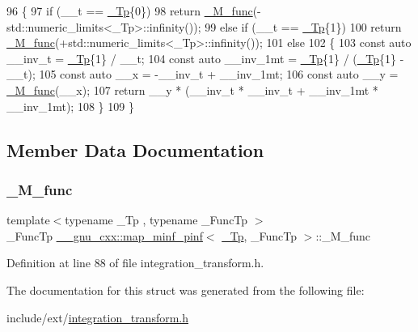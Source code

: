 \begin{DoxyCode}
96       \{
97         \textcolor{keywordflow}{if} (\_\_t == \hyperlink{namespace____gnu__cxx_a3b19a9c800ca194374ef9172290f7d79}{\_Tp}\{0\})
98           \textcolor{keywordflow}{return} \hyperlink{struct____gnu__cxx_1_1map__minf__pinf_a38f287d24e3b40dc964637ac5e8f2532}{\_M\_func}(-std::numeric\_limits<\_Tp>::infinity());
99         \textcolor{keywordflow}{else} \textcolor{keywordflow}{if} (\_\_t == \hyperlink{namespace____gnu__cxx_a3b19a9c800ca194374ef9172290f7d79}{\_Tp}\{1\})
100           \textcolor{keywordflow}{return} \hyperlink{struct____gnu__cxx_1_1map__minf__pinf_a38f287d24e3b40dc964637ac5e8f2532}{\_M\_func}(+std::numeric\_limits<\_Tp>::infinity());
101         \textcolor{keywordflow}{else}
102           \{
103             \textcolor{keyword}{const} \textcolor{keyword}{auto} \_\_inv\_t = \hyperlink{namespace____gnu__cxx_a3b19a9c800ca194374ef9172290f7d79}{\_Tp}\{1\} / \_\_t;
104             \textcolor{keyword}{const} \textcolor{keyword}{auto} \_\_inv\_1mt = \hyperlink{namespace____gnu__cxx_a3b19a9c800ca194374ef9172290f7d79}{\_Tp}\{1\} / (\hyperlink{namespace____gnu__cxx_a3b19a9c800ca194374ef9172290f7d79}{\_Tp}\{1\} - \_\_t);
105             \textcolor{keyword}{const} \textcolor{keyword}{auto} \_\_x = -\_\_inv\_t + \_\_inv\_1mt;
106             \textcolor{keyword}{const} \textcolor{keyword}{auto} \_\_y = \hyperlink{struct____gnu__cxx_1_1map__minf__pinf_a38f287d24e3b40dc964637ac5e8f2532}{\_M\_func}(\_\_x);
107             \textcolor{keywordflow}{return} \_\_y * (\_\_inv\_t * \_\_inv\_t + \_\_inv\_1mt * \_\_inv\_1mt);
108           \}
109       \}
\end{DoxyCode}


\subsection{Member Data Documentation}
\mbox{\label{struct____gnu__cxx_1_1map__minf__pinf_a38f287d24e3b40dc964637ac5e8f2532}} 
\subsubsection{\texorpdfstring{\+\_\+\+M\+\_\+func}{\_M\_func}}
{\footnotesize\ttfamily template$<$typename \+\_\+\+Tp , typename \+\_\+\+Func\+Tp $>$ \\
\+\_\+\+Func\+Tp \hyperlink{struct____gnu__cxx_1_1map__minf__pinf}{\+\_\+\+\_\+gnu\+\_\+cxx\+::map\+\_\+minf\+\_\+pinf}$<$ \hyperlink{namespace____gnu__cxx_a3b19a9c800ca194374ef9172290f7d79}{\+\_\+\+Tp}, \+\_\+\+Func\+Tp $>$\+::\+\_\+\+M\+\_\+func}



Definition at line 88 of file integration\+\_\+transform.\+h.



The documentation for this struct was generated from the following file\+:\begin{DoxyCompactItemize}
\item 
include/ext/\hyperlink{integration__transform_8h}{integration\+\_\+transform.\+h}\end{DoxyCompactItemize}
